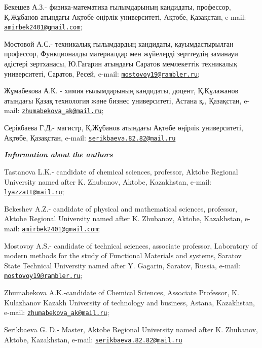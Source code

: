 Бекешев А.З.- физика-математика ғылымдарының кандидаты, профессор,
Қ.Жұбанов атындағы Ақтөбе өңірлік университеті, Ақтөбе, Қазақстан,
e-mail:
\href{mailto:amirbek2401@gmail.com}{\nolinkurl{amirbek2401@gmail.com}};

Мостовой А.С.- техникалық ғылымдардың кандидаты, қауымдастырылған
профессор, Функционалды материалдар мен жүйелерді зерттеудің заманауи
әдістері зертханасы, Ю.Гагарин атындағы Саратов мемлекеттік техникалық
университеті, Саратов, Ресей, e-mail:
\href{mailto:mostovoy19@rambler.ru}{\nolinkurl{mostovoy19@rambler.ru}};

Жұмабекова А.К. - химия ғылымдарының кандидаты, доцент, Қ.Құлажанов
атындағы Қазақ технология және бизнес университеті, Астана қ.,
Қазақстан, e-mail:
\href{mailto:zhumabekova_ak@mail.ru}{\nolinkurl{zhumabekova\_ak@mail.ru}};

Серікбаева Г.Д.- магистр, Қ.Жұбанов атындағы Ақтөбе өңірлік
университеті, Ақтөбе, Қазақстан, e-mail:
\href{mailto:serikbaeva.82.82@mail.ru}{\nolinkurl{serikbaeva.82.82@mail.ru}}

\emph{{\bfseries Information about the authors}}

Tastanova L.K.- candidate of chemical sciences, professor, Aktobe
Regional University named after K. Zhubanov, Aktobe, Kazakhstan, e-mail:
\href{mailto:lyazzatt@mail.ru}{\nolinkurl{lyazzatt@mail.ru}};

Bekeshev A.Z.- candidate of physical and mathematical sciences,
professor, Aktobe Regional University named after K. Zhubanov, Aktobe,
Kazakhstan, e-mail:
\href{mailto:amirbek2401@gmail.com}{\nolinkurl{amirbek2401@gmail.com}};

Mostovoy A.S.- candidate of technical sciences, associate professor,
Laboratory of modern methods for the study of Functional Materials and
systems, Saratov State Technical University named after Y. Gagarin,
Saratov, Russia, e-mail:
\href{mailto:mostovoy19@rambler.ru}{\nolinkurl{mostovoy19@rambler.ru}};

Zhumabekova A.K.-candidate of Chemical Sciences, Associate Professor, K.
Kulazhanov Kazakh University of technology and business, Astana,
Kazakhstan, e-mail:
\href{mailto:zhumabekova_ak@mail.ru}{\nolinkurl{zhumabekova\_ak@mail.ru}};

Serikbaeva G. D.- Master, Aktobe Regional University named after K.
Zhubanov, Aktobe, Kazakhstan, e-mail:
\href{mailto:serikbaeva.82.82@mail.ru}{\nolinkurl{serikbaeva.82.82@mail.ru}}
